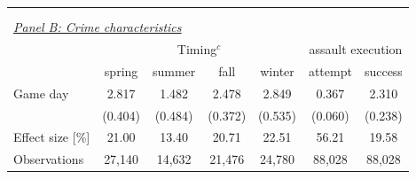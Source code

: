 \begin{table}[ht]
\begin{threeparttable}
{\begin{tabular}{l*{6}{c}}
				\\\\\\
				\multicolumn{6}{l}{\textit{\underline{Panel B: Crime characteristics}}} \\
				& \multicolumn{4}{c}{Timing$^c$} & \multicolumn{2}{c}{assault execution} \\
				\cmidrule(lr){2-5} \cmidrule(lr){6-7}
				& spring & summer & fall & winter & attempt & success \\
				\midrule
				Game day            	 &     2.817\sym{***}&       1.482\sym{**} &       2.478\sym{***}&       2.849\sym{***}&       0.367\sym{***}&       2.310\sym{***}\\
										 &   (0.404)         &     (0.484)         &     (0.372)         &     (0.535)         &     (0.060)         &     (0.238)         \\
				Effect size [\%]&     21.00         &       13.40         &       20.71         &       22.51         &       56.21         &       19.58         \\
				Observations        	 &    27,140         &      14,632         &      21,476         &      24,780         &      88,028         &      88,028         \\
				

\end{tabular}}
\end{threeparttable}
\end{table}

